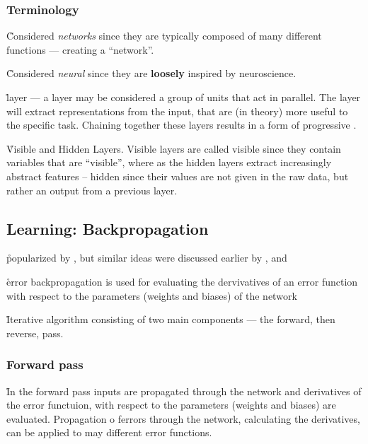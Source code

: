 \subsubsection{Terminology}

\r{Considered \textit{networks} since they are typically composed of many different functions --- creating a ``network''.}

\r{Considered \textit{neural} since they are \textbf{loosely} inspired by neuroscience.}

\r{layer --- a layer may be considered a group of units that act in parallel. The layer will extract representations from the input, that are (in theory) more useful to the specific task.  Chaining together these layers results in a form of progressive .}

\r{Visible and Hidden Layers. Visible layers are called visible since they contain variables that are ``visible'', where as the hidden layers extract increasingly abstract features -- hidden since their values are not given in the raw data, but rather an output from a previous layer.}



\subsection{Learning: Backpropagation}


\r{popularized by , but similar ideas were discussed earlier by , and }

\r{error backpropagation is used for evaluating the dervivatives of an error function with respect to the parameters (weights and biases) of the network}

\r{Iterative algorithm consisting of two main components --- the forward, then reverse, pass.}



\subsubsection{Forward pass}

\r{In the forward pass inputs are propagated through the network and derivatives of the error functuion, with respect to the parameters (weights and biases) are evaluated. Propagation o ferrors through the network, calculating the derivatives, can be applied to may different error functions.}


